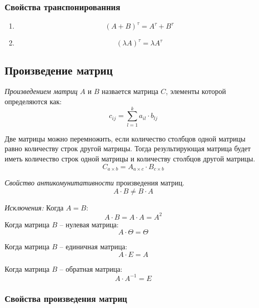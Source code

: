 \subsubsection{Свойства транспонированния}

\begin{enumerate}
  \item \[
      (A + B)^\tau = A^\tau + B^\tau
  \] 

  \item \[
    (\lambda A)^\tau = \lambda A^\tau
\] 
\end{enumerate}

\subsection{Произведение матриц}

\begin{definition}
  \textit{Произведением матриц} $A$ и $B$ назвается матрица $C$, элементы которой определяются как: \[
    c_{ij} = \sum_{l=1}^{k} a_{il} \cdot b_{lj}
  \] 
\end{definition}

\begin{note}
  Две матрицы можно перемножить, если количество столбцов одной матрицы равно количеству строк другой матрицы. Тогда результирующая матрица будет иметь количество строк одной матрицы и количеству столбцов другой матрицы. \[
    C_{a \times b} = A_{a \times c} \cdot B_{c \times b}
  \] 
\end{note}

\textit{Свойство антикомунитативности} произведения матриц. 
\[
  A \cdot B \neq B \cdot A
\]

\begin{note}
  \textit{Исключения:} 
  Когда $A = B$:  \[
  
    A \cdot B = A \cdot A = A^2
  \]  
  Когда матрица $B$ -- нулевая матрица:
  \[
    A \cdot \Theta = \Theta
  \] 

  Когда матрица  $B$ -- единичная матрица:
  \[
    A \cdot E = A
  \] 

  Когда матрица $B$ -- обратная матрица:
  \[
    A \cdot A^{-1} = E
  \] 
\end{note}

\subsubsection{Свойства произведения матриц}

